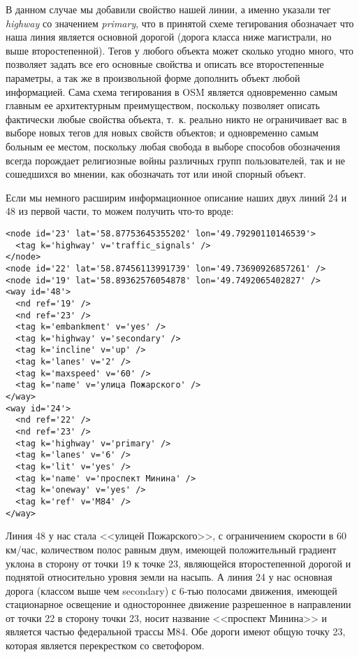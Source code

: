 В данном случае мы добавили свойство нашей линии, а именно указали тег 
\emph{highway} со значением \emph{primary}, что в принятой схеме тегирования 
обозначает что наша линия является основной дорогой (дорога класса ниже 
магистрали, но выше второстепенной). Тегов у любого объекта может сколько 
угодно много, что позволяет задать все его основные свойства и описать все 
второстепенные параметры, а так же в произвольной форме дополнить объект любой 
информацией. Сама схема тегирования в OSM является одновременно самым главным 
ее архитектурным преимуществом, поскольку позволяет описать фактически любые 
свойства объекта, т.~к. реально никто не ограничивает вас в выборе новых тегов 
для новых свойств объектов; и одновременно самым больным ее местом, поскольку 
любая свобода в выборе способов обозначения всегда порождает религиозные войны 
различных групп пользователей, так и не сошедшихся во мнении, как обозначать 
тот или иной спорный объект.

Если мы немного расширим информационное описание наших двух линий 24 и 48 из 
первой части, то можем получить что-то вроде:

\small
\begin{verbatim}
<node id='23' lat='58.87753645355202' lon='49.79290110146539'>
  <tag k='highway' v='traffic_signals' />
</node>
<node id='22' lat='58.87456113991739' lon='49.73690926857261' />
<node id='19' lat='58.89362576054878' lon='49.7492065402827' />
<way id='48'>
  <nd ref='19' />
  <nd ref='23' />
  <tag k='embankment' v='yes' />
  <tag k='highway' v='secondary' />
  <tag k='incline' v='up' />
  <tag k='lanes' v='2' />
  <tag k='maxspeed' v='60' />
  <tag k='name' v='улица Пожарского' />
</way>
<way id='24'>
  <nd ref='22' />
  <nd ref='23' />
  <tag k='highway' v='primary' />
  <tag k='lanes' v='6' />
  <tag k='lit' v='yes' />
  <tag k='name' v='проспект Минина' />
  <tag k='oneway' v='yes' />
  <tag k='ref' v='М84' />
</way>
\end{verbatim}
\normalsize

Линия 48 у нас стала <<улицей Пожарского>>, с ограничением скорости в 
60 км/час, количеством полос равным двум, имеющей положительный градиент 
уклона в сторону от точки 19 к точке 23, являющейся второстепенной дорогой и 
поднятой относительно уровня земли на насыпь. А линия 24 у нас основная дорога 
(классом выше чем secondary) с 6-тью полосами движения, имеющей стационарное 
освещение и одностороннее движение разрешенное в направлении от точки 22 в 
сторону точки 23, носит название <<проспект Минина>> и является частью 
федеральной трассы М84. Обе дороги имеют общую точку 23, которая является 
перекрестком со светофором. \cite{habrahabr02}

